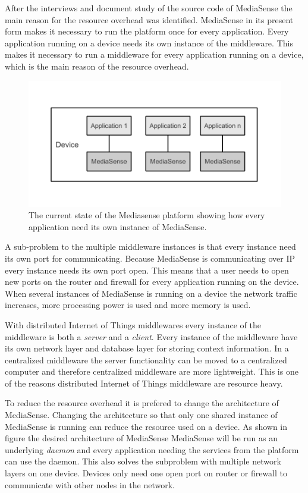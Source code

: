 After the interviews and document study of the source code of MediaSense the main reason for the resource overhead was identified. MediaSense in its present form makes it necessary to run the platform once for every application. Every application running on a device needs its own instance of the middleware. This makes it necessary to run a middleware for every application running on a device, which is the main reason of the resource overhead. 

\begin{figure}[h!]
		\centering
    	\includegraphics[scale=0.75]{part_4/result_and_analysis/mediasense_arch_old.pdf}
		\caption{The current state of the Mediasense platform showing how every application need its own instance of MediaSense.} 
\end{figure}

A sub-problem to the multiple middleware instances is that every instance need its own port for communicating. Because MediaSense is communicating over IP every instance needs its own port open. This means that a user needs to open new ports on the router and firewall for every application running on the device. When several instances of MediaSense is running on a device the network traffic increases, more processing power is used and more memory is used. 

With distributed Internet of Things middlewares every instance of the middleware is both a \emph{server} and a \emph{client}. Every instance of the middleware have its own network layer and database layer for storing context information. In a centralized middleware the server functionality can be moved to a centralized computer and therefore centralized middleware are more lightweight. This is one of the reasons distributed Internet of Things middleware are resource heavy. 

To reduce the resource overhead it is prefered to change the architecture of MediaSense. Changing the architecture so that only one shared instance of MediaSense is running can reduce the resource used on a device.  As shown in figure the desired architecture of MediaSense MediaSense will be run as an underlying  \emph{daemon} and every application needing the services from the platform can use the daemon. This also solves the subproblem with multiple network layers on one device. Devices only need one open port on router or firewall to communicate with other nodes in the network.  

